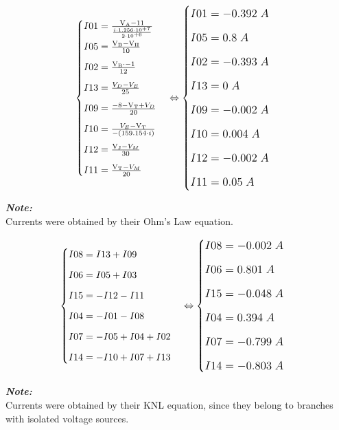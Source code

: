 \documentclass[a4paper]{article}
\begin{document}
\begin{gather*}
\begin{cases}I01 = \frac{\mathrm{V_{A}}-11}{\frac{ i\cdot1.256\cdot10^{+7}}{2\cdot10^{+6}}} \\[0.7em] I05 = \frac{\mathrm{V_{B}}-\mathrm{V_{H}}}{10} \\[0.7em] I02 = \frac{\mathrm{V_{B}}\cdot-1}{12} \\[0.7em] I13 = \frac{ V_{D}- V_{E}}{25} \\[0.7em] I09 = \frac{-8-\mathrm{V_{T}}+ V_{D}}{20} \\[0.7em] I10 = \frac{ V_{E}-\mathrm{V_{T}}}{-\left(159.154\cdot i\right)} \\[0.7em] I12 = \frac{\mathrm{V_{J}}- V_{M}}{30} \\[0.7em] I11 = \frac{\mathrm{V_{T}}- V_{M}}{20}\end{cases} \Leftrightarrow\large \begin{cases}I01 = -0.392\;A \\[0.7em] I05 = 0.8\;A \\[0.7em] I02 = -0.393\;A \\[0.7em] I13 = 0\;A \\[0.7em] I09 = -0.002\;A \\[0.7em] I10 = 0.004\;A \\[0.7em] I12 = -0.002\;A \\[0.7em] I11 = 0.05\;A\end{cases}
\end{gather*}
\begin{footnotesize}
\textbf{\textit{Note:}} \\
Currents were obtained by their Ohm's Law equation.
\end{footnotesize}

\begin{gather*}
\begin{cases}I08 = I13 + I09 \\[0.7em] I06 = I05 + I03 \\[0.7em] I15 = -I12 - I11 \\[0.7em] I04 = -I01 - I08 \\[0.7em] I07 = -I05 + I04 + I02 \\[0.7em] I14 = -I10 + I07 + I13\end{cases} \Leftrightarrow\large \begin{cases}I08 = -0.002\;A \\[0.7em] I06 = 0.801\;A \\[0.7em] I15 = -0.048\;A \\[0.7em] I04 = 0.394\;A \\[0.7em] I07 = -0.799\;A \\[0.7em] I14 = -0.803\;A\end{cases}
\end{gather*}
\begin{footnotesize}
\textbf{\textit{Note:}} \\
Currents were obtained by their KNL equation, since they belong to branches with isolated voltage sources.
\end{footnotesize}
\end{document}
